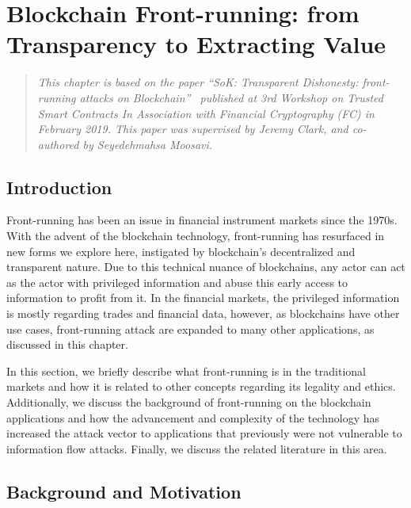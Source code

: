 

\chapter{Blockchain Front-running: from Transparency to Extracting Value} \label{sec:frontrunning}



\begin{quote}
	\textit{This chapter is based on the paper ``SoK: Transparent Dishonesty: front-running attacks on Blockchain''~\cite{eskandari2019sok} published at 3rd Workshop on Trusted Smart Contracts In Association with Financial Cryptography (FC) in February 2019. This paper was supervised by Jeremy Clark, and co-authored by Seyedehmahsa Moosavi.}
\end{quote}


\section{Introduction}

Front-running has been an issue in financial instrument markets since the 1970s. With the advent of the blockchain technology, front-running has resurfaced in new forms we explore here, instigated by blockchain's decentralized and transparent nature. Due to this technical nuance of blockchains, any actor can act as the actor with privileged information and abuse this early access to information to profit from it. In the financial markets, the privileged information is mostly regarding trades and financial data, however, as blockchains have other use cases, front-running attack are expanded to many other applications, as discussed in this chapter. 

In this section, we briefly describe what front-running is in the traditional markets and how it is related to other concepts regarding its legality and ethics. Additionally, we discuss the background of front-running on the blockchain applications and how the advancement and complexity of the technology has increased the attack vector to applications that previously were not vulnerable to information flow attacks. Finally, we discuss the related literature in this area. 


\section{Background and Motivation}



